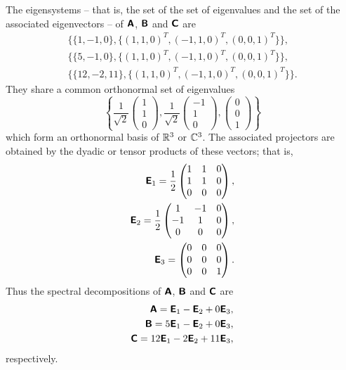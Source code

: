 {The eigensystems -- that is, the set of the set of eigenvalues and the set of the associated eigenvectors -- of $\textsf{\textbf{A}}$,
$\textsf{\textbf{B}}$
and
$\textsf{\textbf{C}}$
are
\begin{equation}
\begin{split}
\{\{1,-1,  0\}, \{(1, 1, 0)^T, (-1, 1, 0)^T, (0, 0, 1)^T\}\} ,\\
\{\{5, -1, 0\},  \{(1, 1, 0)^T, (-1, 1, 0)^T, (0, 0, 1)^T\}\},\\
\{\{12, -2, 11\},  \{(1, 1, 0)^T, (-1, 1, 0)^T, (0, 0, 1)^T\}\}.
\end{split}
\end{equation}
They share a common orthonormal set of eigenvalues
$$
\left\{
\frac{1}{\sqrt{2}}
\begin{pmatrix}
1\\ 1\\ 0
\end{pmatrix},
\frac{1}{\sqrt{2}}
\begin{pmatrix}
-1\\ 1\\ 0
\end{pmatrix},
\begin{pmatrix}
0\\ 0\\ 1\end{pmatrix}
\right\}
$$
which form an orthonormal basis of ${\Bbb R}^3$ or ${\Bbb C}^3$.
The associated projectors are obtained by the dyadic or tensor products of these vectors; that is,
\begin{equation}
\begin{split}
\textsf{\textbf{E}}_1= \frac{1}{2}
\begin{pmatrix}
1& 1& 0\\
1& 1& 0\\
0& 0& 0
\end{pmatrix},\\
\textsf{\textbf{E}}_2= \frac{1}{2}
\begin{pmatrix}
1& -1& 0\\
-1& 1& 0\\
0& 0& 0
\end{pmatrix},\\
\textsf{\textbf{E}}_3=
\begin{pmatrix}
0& 0& 0\\
0& 0& 0\\
0& 0& 1
\end{pmatrix}.
\end{split}
\end{equation}
Thus the spectral decompositions of
$\textsf{\textbf{A}}$,
$\textsf{\textbf{B}}$  and
$\textsf{\textbf{C}}$ are
\begin{equation}
\begin{split}
\textsf{\textbf{A}}= \textsf{\textbf{E}}_1  - \textsf{\textbf{E}}_2  + 0  \textsf{\textbf{E}}_3,\\
\textsf{\textbf{B}}= 5\textsf{\textbf{E}}_1  - \textsf{\textbf{E}}_2  + 0 \textsf{\textbf{E}}_3,\\
\textsf{\textbf{C}}= 12\textsf{\textbf{E}}_1  -2 \textsf{\textbf{E}}_2  + 11\textsf{\textbf{E}}_3,
\end{split}
\label{2011-m-empc}
\end{equation}
respectively.


}

